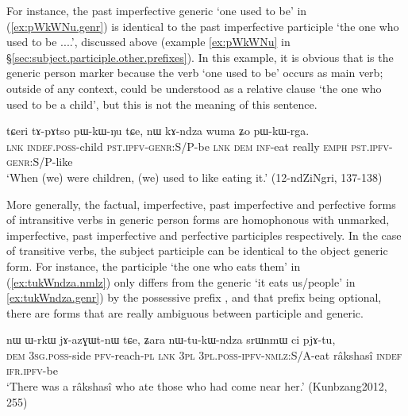 For instance, the past imperfective generic  `one used to be' in (\ref{ex:pWkWNu.genr}) is identical to the past imperfective participle  `the one who used to be ....', discussed above (example \ref{ex:pWkWNu} in §\ref{sec:subject.participle.other.prefixes}). In this example, it is obvious that  is the generic person marker because the verb  `one used to be' occurs as main verb; outside of any context,   could be understood as a relative clause `the one who used to be a child', but this is not the meaning of this sentence. 

\begin{exe}
\ex \label{ex:pWkWNu.genr}
 \gll tɕeri tɤ-pɤtso pɯ-kɯ-ŋu tɕe, nɯ kɤ-ndza wuma ʑo pɯ-kɯ-rga. \\
 \textsc{lnk} \textsc{indef}.\textsc{poss}-child \textsc{pst}.\textsc{ipfv}-\textsc{genr}:S/P-be \textsc{lnk} \textsc{dem} \textsc{inf}-eat really \textsc{emph} \textsc{pst}.\textsc{ipfv}-\textsc{genr}:S/P-like \\
 \glt `When (we) were children, (we) used to like eating it.' (12-ndZiNgri, 137-138)
\end{exe}

More generally, the factual, imperfective, past imperfective and perfective forms of intransitive verbs in generic person forms are homophonous with unmarked, imperfective, past imperfective and perfective participles respectively. In the case of transitive verbs, the subject participle can be identical to the object generic form. For instance, the participle  `the one who eats them' in (\ref{ex:tukWndza.nmlz}) only differs from the generic  `it eats us/people' in \ref{ex:tukWndza.genr}) by the possessive prefix , and that prefix being optional, there are forms that are really ambiguous between participle and generic. 

\begin{exe}
\ex \label{ex:tukWndza.nmlz}
 \gll nɯ ɯ-rkɯ jɤ-azɣɯt-nɯ tɕe, ʑara nɯ-tu-kɯ-ndza srɯnmɯ ci pjɤ-tu, \\
 \textsc{dem} \textsc{3sg}.\textsc{poss}-side \textsc{pfv}-reach-\textsc{pl} \textsc{lnk} \textsc{3pl} \textsc{3pl}.\textsc{poss}-\textsc{ipfv}-\textsc{nmlz}:S/A-eat râkshasî \textsc{indef} \textsc{ifr}.\textsc{ipfv}-be \\
\glt `There was a râkshasî who ate those who had come near her.' (Kunbzang2012, 255)
\end{exe}

